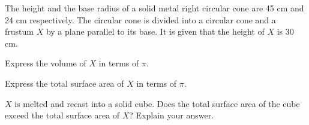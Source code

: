 
The height and the base radius of a solid metal right circular cone are 45 cm and 24 cm respectively. The circular cone is divided into a circular cone and a frustum $X$ by a plane parallel to its base. It is given that the height of $X$ is 30 cm.
\begin{enumx}[label=(\alph*)]
    \item Express the volume of $X$ in terms of $\pi$.
    \item Express the total surface area of $X$ in terms of $\pi$.
    \item $X$ is melted and recast into a solid cube. Does the total surface area of the cube exceed the total surface area of $X$? Explain your answer.
\end{enumx}






